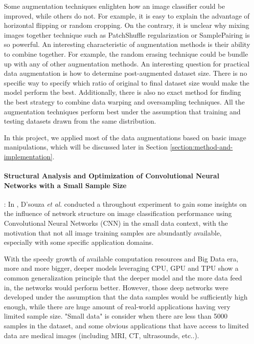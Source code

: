\documentclass[10pt,twocolumn,letterpaper]{article}
\begin{document}
Some augmentation techniques enlighten how an image classifier could be improved, while others do not. For example, it is easy to explain the advantage of horizontal flipping or random cropping. On the contrary, it is unclear why mixing images together technique such as PatchShuffle regularization or SamplePairing is so powerful. An interesting characteristic of augmentation methods is their ability to combine together. For example, the random erasing technique could be bundle up with any of other augmentation methods. An interesting question for practical data augmentation is how to determine post-augmented dataset size. There is no specific way to specify which ratio of original to final dataset size would make the model perform the best. Additionally, there is also no exact method for finding the best strategy to combine data warping and oversampling techniques. All the augmentation techniques perform best under the assumption that training and testing datasets drawn from the same distribution.

In this project, we applied most of the data augmentations based on basic image manipulations, which will be discussed later in Section \ref{section:method-and-implementation}.

\paragraph{Structural Analysis and Optimization of Convolutional Neural Networks with a Small Sample Size}: In \cite{dsouza_structural_2020}, D’souza \textit{et al.} conducted a throughout experiment to gain some insights on the influence of network structure on image classification performance using Convolutional Neural Networks (CNN) \cite{krizhevsky12_cnn} in the small data context, with the motivation that not all image training samples are abundantly available, especially with some specific application domains. 

With the speedy growth of available computation resources and Big Data era, more and more bigger, deeper models leveraging CPU, GPU and TPU show a common generalization principle that the deeper model and the more data feed in, the networks would perform better. However, those deep networks were developed under the assumption that the data samples would be sufficiently high enough, while there are huge amount of real-world applications having very limited sample size. "Small data" is consider when there are less than 5000 samples in the dataset, and some obvious applications that have access to limited data are medical images (including MRI, CT, ultrasounds, etc..).   
\end{document}
